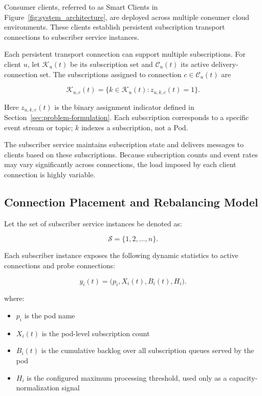 \documentclass[manuscript]{acmart}
\begin{document}
Consumer clients, referred to as Smart Clients in Figure~\ref{fig:system_architecture}, are deployed across multiple consumer cloud environments. These clients establish persistent subscription transport connections to subscriber service instances.

Each persistent transport connection can support multiple subscriptions. For
client $u$, let $\mathcal{K}_u(t)$ be its subscription set and
$\mathcal{C}_u(t)$ its active delivery-connection set. The subscriptions
assigned to connection $c\in\mathcal{C}_u(t)$ are

\begin{equation}
	\mathcal{K}_{u,c}(t)=\{k\in\mathcal{K}_u(t):z_{u,k,c}(t)=1\}.
\end{equation}

Here $z_{u,k,c}(t)$ is the binary assignment indicator defined in
Section~\ref{sec:problem-formulation}. Each subscription corresponds to a
specific event stream or topic; $k$ indexes a subscription, not a Pod.

The subscriber service maintains subscription state and delivers messages to clients based on these subscriptions.
Because subscription counts and event rates may vary significantly across connections, the load imposed by each client connection is highly variable.

\subsection{Connection Placement and Rebalancing Model}

Let the set of subscriber service instances be denoted as:

\begin{equation}
	\mathcal{S}=\{1,2,\ldots,n\}.
\end{equation}

Each subscriber instance exposes the following dynamic statistics to active
connections and probe connections:

\begin{equation}
	y_i(t)=\bigl(p_i,X_i(t),B_i(t),H_i\bigr).
\end{equation}

where:

\begin{itemize}
	\item $p_i$ is the pod name
	\item $X_i(t)$ is the pod-level subscription count
	\item $B_i(t)$ is the cumulative backlog over all subscription queues served by the pod
	\item $H_i$ is the configured maximum processing threshold, used only as a capacity-normalization signal
\end{itemize}
\end{document}

